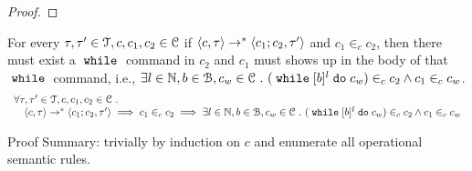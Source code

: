 \begin{proof}
\end{proof}
%
\begin{lem}
	\label{lem:inv_while}
	For every $\mathtt{\tau}, \mathtt{\tau}' \in \mathcal{T}, c, c_1, c_2 \in \mathcal{C}$ 
	if $ \langle c, \mathtt{\tau} \rangle \rightarrow^* \langle c_1; c_2, \mathtt{\tau}' \rangle$ and 
	$c_1 \in_c c_2$, 
	then there must exist a $\;\mathtt{while}\;$ command in $c_2$ and $c_1$ must shows up in the body of that $\;\mathtt{while}\;$ command,
	 i.e., $\exists l \in \mathbb{N}, b \in \mathcal{B}, c_w \in \mathcal{C} ~.~ 
	(\;\mathtt{while}\; [b]^l \;\mathtt{do}\; c_w) \in_c c_2 \land c_1 \in_c c_w$.
	\[
	\begin{array}{l}
	\forall \mathtt{\tau}, \mathtt{\tau}' \in \mathcal{T}, c, c_1, c_2 \in \mathcal{C} ~.~
		\\ \quad
		\langle c, \mathtt{\tau} \rangle \rightarrow^* \langle c_1; c_2, \mathtt{\tau}' \rangle
		\implies
		c_1 \in_c c_2
		\implies
		\exists l \in \mathbb{N}, b \in \mathcal{B}, c_w \in \mathcal{C} ~.~ 
		(\;\mathtt{while}\; [b]^l \;\mathtt{do}\; c_w) \in_c c_2 \land c_1 \in_c c_w
	\end{array}
	\]
	\end{lem}	
	Proof Summary: trivially by induction on $c$ and enumerate all operational semantic rules.
